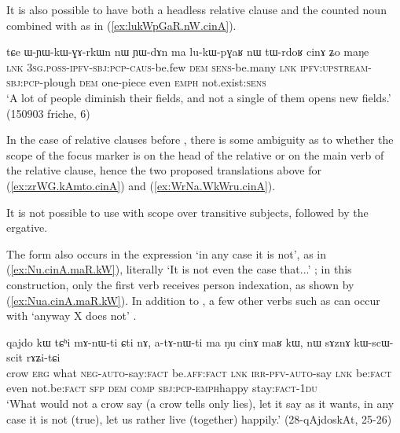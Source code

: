 It is also possible to have both a headless relative clause and the counted noun  combined with  as in (\ref{ex:lukWpGaR.nW.cinA}).

  \begin{exe}
\ex \label{ex:lukWpGaR.nW.cinA}
\gll tɕe ɯ-ɲɯ-kɯ-ɣɤ-rkɯn nɯ ɲɯ-dɤn ma lu-kɯ-pɣaʁ nɯ tɯ-rdoʁ cinɤ ʑo maŋe\\
\textsc{lnk} \textsc{3sg}.\textsc{poss}-\textsc{ipfv}-\textsc{sbj}:\textsc{pcp}-\textsc{caus}-be.few \textsc{dem} \textsc{sens}-be.many \textsc{lnk} \textsc{ipfv}:\textsc{upstream}-\textsc{sbj}:\textsc{pcp}-plough \textsc{dem} one-piece even \textsc{emph} not.exist:\textsc{sens}\\
\glt `A lot of people diminish their fields, and not a single of them opens new fields.' (150903 friche, 6)
\end{exe}

In the case of relative clauses before , there is some ambiguity as to whether the scope of the focus marker is on the head of the relative or on the main verb of the relative clause, hence the two proposed translations above for (\ref{ex:zrWG.kAmto.cinA}) and (\ref{ex:WrNa.WkWru.cinA}).

It is not possible to use  with scope over transitive subjects, followed by the ergative.

The form  also occurs in the expression  `in any case it is not', as in (\ref{ex:Nu.cinA.maR.kW}), literally `It is not even the case that...' ; in this construction, only the first verb  receives person indexation, as shown by (\ref{ex:Nua.cinA.maR.kW}). In addition to , a few other verbs such as  can occur with  `anyway X does not' .

 \begin{exe}
\ex \label{ex:Nu.cinA.maR.kW}
\gll qajdo kɯ tɕʰi mɤ-nɯ-ti ɕti nɤ, a-tɤ-nɯ-ti ma ŋu cinɤ maʁ kɯ, nɯ sɤznɤ kɯ-scɯ-scit rɤʑi-tɕi \\
crow \textsc{erg} what \textsc{neg}-\textsc{auto}-say:\textsc{fact} be.\textsc{aff}:\textsc{fact} \textsc{lnk} \textsc{irr}-\textsc{pfv}-\textsc{auto}-say \textsc{lnk} be:\textsc{fact} even not.be:\textsc{fact} \textsc{sfp} \textsc{dem} \textsc{comp} \textsc{sbj}:\textsc{pcp}-\textsc{emph}\redp{}happy stay:\textsc{fact}-\textsc{1du} \\
\glt `What would not a crow say (a crow tells only lies), let it say as it wants, in any case it is not (true), let us rather live (together) happily.' (28-qAjdoskAt, 25-26)
\end{exe} 

